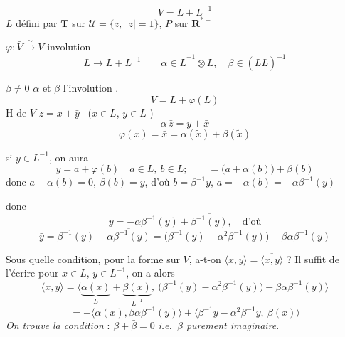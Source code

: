 \documentclass[11pt,a4paper]{article}
\begin{document}
\[
V = L + L^{-1}
\]
$L$ défini par $\mathbf{T}$ sur $\mathcal{U}=\lbrace z,\ |z|=1\rbrace$,
$P$ sur $\mathbf{R}^{*+}$

$\varphi\colon \bar V \xrightarrow{\ \sim\ } V$ involution
\[
\bar L \to L + L^{-1} \qquad \alpha\in \bar L^{-1}\otimes L,\quad
\beta\in(\bar L L)^{-1}
\]

$\boxed{\beta\neq 0}$ \quad {} 
\ill{} $\alpha$ et $\beta$  \ill{} l'involution \ill{}
\ill{}.
\[
V = L + \varphi(L)
\]
H  de $V$  $z = x + \bar y$
\struck{\ill{}} \ ($x\in L$, $y\in L$ )
\[
\alpha\,\bar z = y + \bar x
\]
\[
\varphi(x) = \bar x = \alpha(\tilde x) + \beta(\tilde x)
\]

si $y\in L^{-1}$, on aura
\[
y = a + \varphi(b) \quad a\in L,\ b\in L;\qquad
= \bigl(a+\alpha(b)\bigr) + \beta(b)
\]
donc $a+\alpha(b)=0$, $\beta(b)=y$, d'où $b=\beta^{-1}y$,
$a=-\alpha(b)=-\alpha\beta^{-1}(y)$

donc
\[
y = -\alpha\beta^{-1}(y) + \overline{\beta^{-1}(y)}, \quad\text{d'où}
\]
\[
\bar y = \beta^{-1}(y) - \overline{\alpha\beta^{-1}(y)}
= \bigl(\beta^{-1}(y) - \alpha^2\beta^{-1}(y)\bigr) - \beta\alpha\beta^{-1}(y)
\]

Sous quelle condition, pour la forme 
 sur $V$, a-t-on
$\langle\bar x,\bar y\rangle = \overline{\langle x,y\rangle}$ ? Il suffit de
l'écrire pour $x\in L$, $y\in L^{-1}$, on a alors
\[
\langle\bar x,\bar y\rangle = \langle\underbrace{\alpha(x)}_{L}
+ \underbrace{\beta(x)}_{L^{-1}},\ \bigl(\beta^{-1}(y)-\alpha^2\beta^{-1}(y)\bigr)
- \beta\alpha\beta^{-1}(y)\rangle
\]
\[
= -\langle\alpha(x),\beta\alpha\beta^{-1}(y)\rangle
+ \langle\beta^{-1}y-\alpha^2\beta^{-1}y,\ \beta(x)\rangle
\]
\emph{On trouve la condition} : $\beta+\bar\beta=0$ \emph{i.e.\ $\beta$
purement imaginaire}.

\struck{\ill{}}
\end{document}
